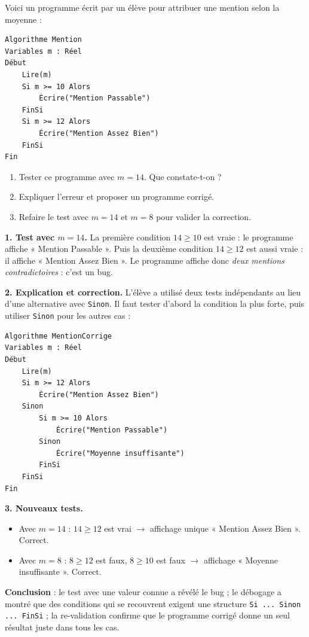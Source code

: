\documentclass[11pt]{article}
\begin{document}
\begin{exoresolu}
Voici un programme écrit par un élève pour attribuer une mention selon la moyenne :
\begin{lstlisting}
Algorithme Mention
Variables m : Réel
Début
    Lire(m)
    Si m >= 10 Alors
        Écrire("Mention Passable")
    FinSi
    Si m >= 12 Alors
        Écrire("Mention Assez Bien")
    FinSi
Fin
\end{lstlisting}
\begin{enumerate}
\item Tester ce programme avec $m = 14$. Que constate-t-on ?
\item Expliquer l'erreur et proposer un programme corrigé.
\item Refaire le test avec $m = 14$ et $m = 8$ pour valider la correction.
\end{enumerate}
\tcblower
\textbf{1. Test avec $m = 14$.} La première condition $14 \geq 10$ est vraie : le programme affiche « Mention Passable ». Puis la deuxième condition $14 \geq 12$ est aussi vraie : il affiche « Mention Assez Bien ». Le programme affiche donc \emph{deux mentions contradictoires} : c'est un bug.

\textbf{2. Explication et correction.} L'élève a utilisé deux tests indépendants au lieu d'une alternative avec \texttt{Sinon}. Il faut tester d'abord la condition la plus forte, puis utiliser \texttt{Sinon} pour les autres cas :
\begin{lstlisting}
Algorithme MentionCorrige
Variables m : Réel
Début
    Lire(m)
    Si m >= 12 Alors
        Écrire("Mention Assez Bien")
    Sinon
        Si m >= 10 Alors
            Écrire("Mention Passable")
        Sinon
            Écrire("Moyenne insuffisante")
        FinSi
    FinSi
Fin
\end{lstlisting}

\textbf{3. Nouveaux tests.}
\begin{itemize}
\item Avec $m = 14$ : $14 \geq 12$ est vrai $\rightarrow$ affichage unique « Mention Assez Bien ». Correct.
\item Avec $m = 8$ : $8 \geq 12$ est faux, $8 \geq 10$ est faux $\rightarrow$ affichage « Moyenne insuffisante ». Correct.
\end{itemize}
\textbf{Conclusion} : le test avec une valeur connue a révélé le bug ; le débogage a montré que des conditions qui se recouvrent exigent une structure \texttt{Si ... Sinon ... FinSi} ; la re-validation confirme que le programme corrigé donne un seul résultat juste dans tous les cas.
\end{exoresolu}
\end{document}
